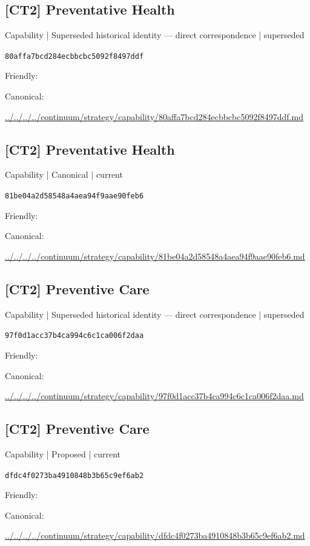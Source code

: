 \documentclass[10pt,a4paper]{article}
\begin{document}
\subsection*{[CT2] Preventative Health}
{\small Capability | Superseded historical identity — direct correspondence | superseded}\par
\texttt{80affa7bcd284ecbbcbc5092f8497ddf}\par
Friendly: \par
Canonical: \par
{\footnotesize\url{../../../../continuum/strategy/capability/80affa7bcd284ecbbcbc5092f8497ddf.md}}\par
\subsection*{[CT2] Preventative Health}
{\small Capability | Canonical | current}\par
\texttt{81be04a2d58548a4aea94f9aae90feb6}\par
Friendly: \par
Canonical: \par
{\footnotesize\url{../../../../continuum/strategy/capability/81be04a2d58548a4aea94f9aae90feb6.md}}\par
\subsection*{[CT2] Preventive Care}
{\small Capability | Superseded historical identity — direct correspondence | superseded}\par
\texttt{97f0d1acc37b4ca994c6c1ca006f2daa}\par
Friendly: \par
Canonical: \par
{\footnotesize\url{../../../../continuum/strategy/capability/97f0d1acc37b4ca994c6c1ca006f2daa.md}}\par
\subsection*{[CT2] Preventive Care}
{\small Capability | Proposed | current}\par
\texttt{dfdc4f0273ba4910848b3b65c9ef6ab2}\par
Friendly: \par
Canonical: \par
{\footnotesize\url{../../../../continuum/strategy/capability/dfdc4f0273ba4910848b3b65c9ef6ab2.md}}\par
\end{document}
